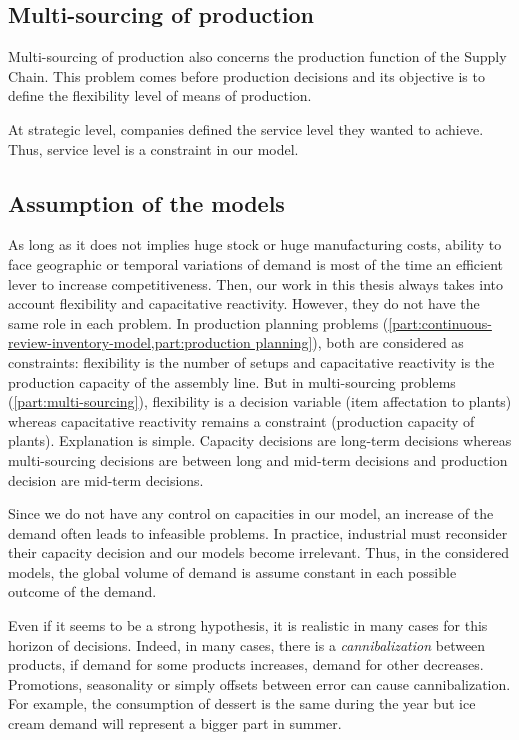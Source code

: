 \subsection{Multi-sourcing of production}
\label{sec:business-context:argon:multi-sourcing}


Multi-sourcing of production also concerns the production function of the Supply Chain.
This problem comes before production decisions and its objective is to define the flexibility level of means of production.


At strategic level, companies defined the service level they wanted to achieve.
Thus, service level is a constraint in our model.



\subsection{Assumption of the models}


As long as it does not implies huge stock or huge manufacturing costs, ability to face geographic or temporal variations of demand is most of the time an efficient lever to increase competitiveness.
Then, our work in this thesis always takes into account flexibility and capacitative reactivity.
However, they do not have the same role in each problem.
In production planning problems (\cref{part:continuous-review-inventory-model,part:production planning}), both are considered as constraints: flexibility is the number of setups and capacitative reactivity is the production capacity of the assembly line.
But in multi-sourcing problems (\cref{part:multi-sourcing}), flexibility is a decision variable (item affectation to plants) whereas capacitative reactivity remains a constraint (production capacity of plants).
Explanation is simple.
Capacity decisions are long-term decisions whereas multi-sourcing decisions are between long and mid-term decisions and production decision are mid-term decisions.


Since we do not have any control on capacities in our model, an increase of the demand often leads to infeasible problems.
In practice, industrial must reconsider their capacity decision and our models become irrelevant.
Thus, in the considered models, the global volume of demand is assume constant in each possible outcome of the demand.


Even if it seems to be a strong hypothesis, it is realistic in many cases for this horizon of decisions.
Indeed, in many cases, there is a \emph{cannibalization} between products, \ie if demand for some products increases, demand for other decreases.
Promotions, seasonality or simply offsets between error can cause cannibalization.
For example, the consumption of dessert is the same during the year but ice cream demand will represent a bigger part in summer.


